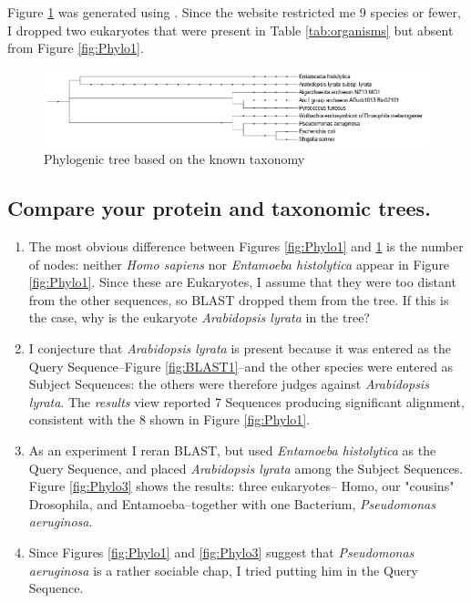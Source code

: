 \documentclass[]{article}
\begin{document}
Figure \ref{fig:Phylo2} was generated using \cite{biobyte2019phylot}. Since the website restricted me 9 species or fewer, I dropped two eukaryotes that were present in Table \ref{tab:organisms} but absent from Figure \ref{fig:Phylo1}.

\begin{figure}[H]
	\caption{Phylogenic tree based on the known taxonomy}\label{fig:Phylo2}
	\includegraphics[width=\textwidth]{Phylo2}
\end{figure}

\subsection{ Compare your protein and taxonomic trees.}\label{sect:compare}

\begin{enumerate}
	\item The most obvious difference between Figures \ref{fig:Phylo1} and  \ref{fig:Phylo2} is the number of nodes: neither \textit{Homo sapiens} nor \textit{Entamoeba histolytica} appear in Figure \ref{fig:Phylo1}. Since these are Eukaryotes, I assume that they were too distant from the other sequences, so BLAST dropped them from the tree. If this is the case, why is the eukaryote \textit{Arabidopsis lyrata} in the tree?
	\item I conjecture that \textit{Arabidopsis lyrata} is present because it was entered as the Query Sequence--Figure \ref{fig:BLAST1}--and the other species were entered as Subject Sequences: the others were therefore judges against \textit{Arabidopsis lyrata}. The \textit{results} view reported 7 Sequences producing significant alignment, consistent with the 8 shown in Figure \ref{fig:Phylo1}.
	\item As an experiment I reran BLAST, but used \textit{Entamoeba histolytica } as the Query Sequence, and placed \textit{Arabidopsis lyrata} among the Subject Sequences. Figure \ref{fig:Phylo3} shows the results: three eukaryotes-- Homo, our "cousins" Drosophila, and Entamoeba--together with one Bacterium, \textit{Pseudomonas aeruginosa}. 
	\item Since Figures \ref{fig:Phylo1} and \ref{fig:Phylo3} suggest that \textit{Pseudomonas aeruginosa} is a rather sociable chap, I tried putting him in the Query Sequence.
\end{enumerate}
\end{document}
